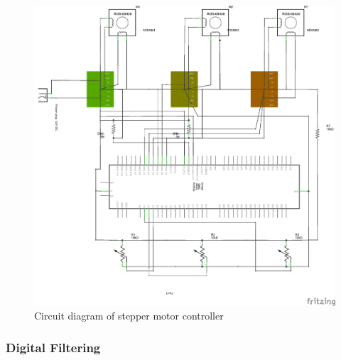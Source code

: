 \begin{figure}[H]
	\centering
	\includegraphics[width=\maxwidth{15cm}, keepaspectratio]{Chapters/Fig/stepper_coltroler_circuit_schem.png}
	\caption{Circuit diagram of stepper motor controller}
	\label{fig:stepper_coltroler_circuit_schem}
\end{figure}
\subsubsection{Digital Filtering}


